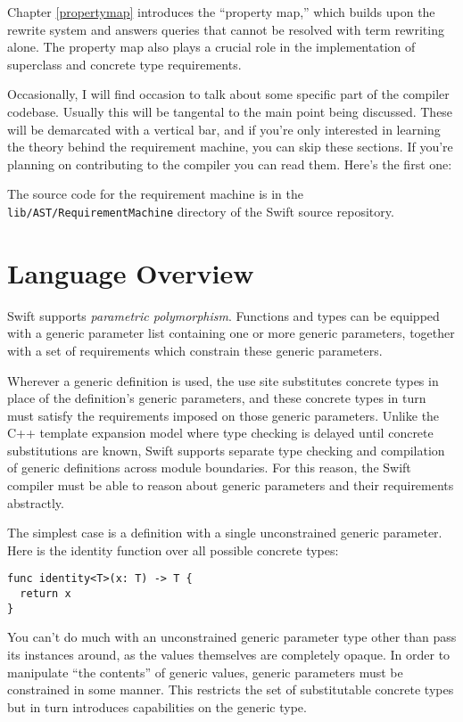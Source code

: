 \documentclass[headsepline,bibliography=totoc]{scrreport}
\theoremstyle{definition}
\theoremstyle{definition}
\theoremstyle{definition}
\begin{document}
Chapter \ref{propertymap} introduces the ``property map,'' which builds upon the rewrite system and answers queries that cannot be resolved with term rewriting alone. The property map also plays a crucial role in the implementation of superclass and concrete type requirements.

Occasionally, I will find occasion to talk about some specific part of the compiler codebase. Usually this will be tangental to the main point being discussed. These  will be demarcated with a vertical bar, and if you're only interested in learning the theory behind the requirement machine, you can skip these sections. If you're planning on contributing to the compiler you can read them. Here's the first one:

\begin{leftbar}
\noindent The source code for the requirement machine is in the \texttt{lib/AST/RequirementMachine} directory of the Swift source repository.
\end{leftbar}

\chapter{Language Overview}\label{languageoverview}

Swift supports \emph{parametric polymorphism}. Functions and types can be equipped with a generic parameter list containing one or more generic parameters, together with a set of requirements which constrain these generic parameters.

Wherever a generic definition is used, the use site substitutes concrete types in place of the definition's generic parameters, and these concrete types in turn must satisfy the requirements imposed on those generic parameters. Unlike the C++ template expansion model where type checking is delayed until concrete substitutions are known, Swift supports separate type checking and compilation of generic definitions across module boundaries. For this reason, the Swift compiler must be able to reason about generic parameters and their requirements abstractly.

The simplest case is a definition with a single unconstrained generic parameter. Here is the identity function over all possible concrete types:
\begin{Verbatim}
func identity<T>(x: T) -> T {
  return x
}
\end{Verbatim}

You can't do much with an unconstrained generic parameter type other than pass its instances around, as the values themselves are completely opaque. In order to manipulate ``the contents'' of generic values, generic parameters must be constrained in some manner. This restricts the set of substitutable concrete types but in turn introduces capabilities on the generic type.
\end{document}
